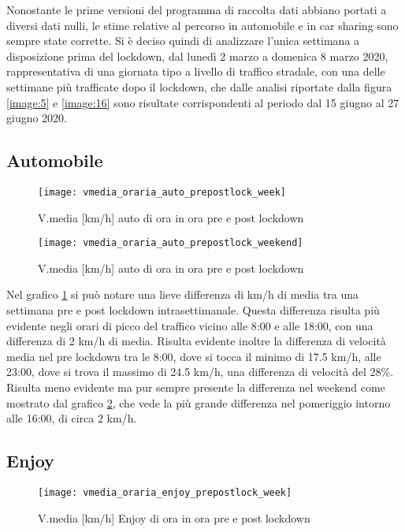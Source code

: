Nonostante le prime versioni del programma di raccolta dati abbiano portati a diversi dati nulli, le stime relative al percorso in automobile e in car sharing sono sempre state corrette. Si è deciso quindi di analizzare l'unica settimana a disposizione prima del lockdown, dal lunedì 2 marzo a domenica 8 marzo 2020, rappresentativa di una giornata tipo a livello di traffico stradale, con una delle settimane più trafficate dopo il lockdown, che dalle analisi riportate dalla figura \ref{image:5} e \ref{image:16} sono risultate corrispondenti al periodo dal 15 giugno al 27 giugno 2020.

\subsection{Automobile}

\begin{figure}[H]
	\texttt{[image: vmedia\_oraria\_auto\_prepostlock\_week]}
	\caption{V.media [km/h] auto di ora in ora pre e post lockdown}
	\label{image:22}
\end{figure}

\begin{figure}[H]
	\texttt{[image: vmedia\_oraria\_auto\_prepostlock\_weekend]}
	\caption{V.media [km/h] auto di ora in ora pre e post lockdown}
	\label{image:23}
\end{figure}

Nel grafico \ref{image:22} si può notare una lieve differenza di km/h di media tra una settimana pre e post lockdown intrasettimanale. Questa differenza risulta più evidente negli orari di picco del traffico vicino alle 8:00 e alle 18:00, con una differenza di 2 km/h di media. Risulta evidente inoltre la differenza di velocità media nel pre lockdown tra le 8:00, dove si tocca il minimo di 17.5 km/h, alle 23:00, dove si trova il massimo di 24.5 km/h, una differenza di velocità del 28\%. Risulta meno evidente ma pur sempre presente la differenza nel weekend come mostrato dal grafico \ref{image:23}, che vede la più grande differenza nel pomeriggio intorno alle 16:00, di circa 2 km/h.

\subsection{Enjoy}

\begin{figure}[H]
	\texttt{[image: vmedia\_oraria\_enjoy\_prepostlock\_week]}
	\caption{V.media [km/h] Enjoy di ora in ora pre e post lockdown}
	\label{image:24}
\end{figure}

